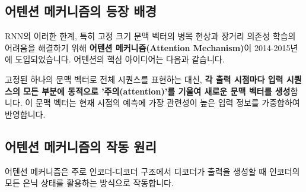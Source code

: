 \documentclass[11pt,a4paper]{article}
\begin{document}
\subsection{어텐션 메커니즘의 등장 배경}
RNN의 이러한 한계, 특히 고정 크기 문맥 벡터의 병목 현상과 장거리 의존성 학습의 어려움을 해결하기 위해 \textbf{어텐션 메커니즘(Attention Mechanism)}이 2014-2015년에 도입되었습니다. 어텐션의 핵심 아이디어는 다음과 같습니다.

\begin{conceptbox}[title={어텐션 메커니즘의 핵심 아이디어: 동적 문맥 표현}]
고정된 하나의 문맥 벡터로 전체 시퀀스를 표현하는 대신, \textbf{각 출력 시점마다 입력 시퀀스의 모든 부분에 동적으로 '주의(attention)'를 기울여 새로운 문맥 벡터를 생성}합니다. 이 문맥 벡터는 현재 시점의 예측에 가장 관련성이 높은 입력 정보를 가중합하여 반영합니다.
\end{conceptbox}

\subsection{어텐션 메커니즘의 작동 원리}
어텐션 메커니즘은 주로 인코더-디코더 구조에서 디코더가 출력을 생성할 때 인코더의 모든 은닉 상태를 활용하는 방식으로 작동합니다.
\end{document}
